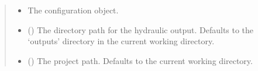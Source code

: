\documentclass[a4paper,11pt,english,openany]{sphinxmanual}
\begin{document}
\begin{fulllineitems}
\begin{fulllineitems}
\label{\detokenize{api/spyice.main_process:src.spyice.main_process.MainProcess.__init__}}
\pysigstartsignatures
\pysiglinewithargsret
{}
{\sphinxparamcomma {}\sphinxparamcomma {}}
{}
\pysigstopsignatures\begin{quote}\begin{description}
\begin{itemize}
\item {} 
\sphinxAtStartPar
{} \textendash{} The configuration object.

\item {} 
\sphinxAtStartPar
{} (\sphinxstyleliteralemphasis{\sphinxupquote{ | }}) \textendash{} The directory path for the hydraulic output. Defaults to the ‘outputs’ directory in the current working directory.

\item {} 
\sphinxAtStartPar
{} (\sphinxstyleliteralemphasis{\sphinxupquote{ | }}) \textendash{} The project path. Defaults to the current working directory.

\end{itemize}

\end{description}\end{quote}

\end{fulllineitems}



\end{fulllineitems}
\end{document}
